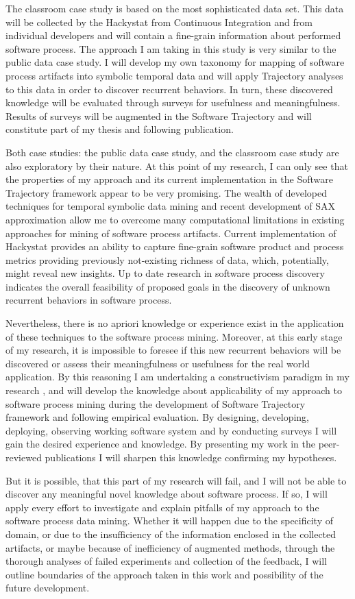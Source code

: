 The classroom case study is based on the most sophisticated data set. This data will be collected by the Hackystat from Continuous Integration and from individual developers and will contain a fine-grain information about performed software process. The approach I am taking in this study is very similar to the public data case study. I will develop my own taxonomy for mapping of software process artifacts into symbolic temporal data and will apply Trajectory analyses to this data in order to discover recurrent behaviors. In turn, these discovered knowledge will be evaluated through surveys for usefulness and meaningfulness. Results of surveys will be augmented in the Software Trajectory and will constitute part of my thesis and following publication.

Both case studies: the public data case study, and the classroom case study are also exploratory by their nature. At this point of my research, I can only see that the properties of my approach and its current implementation in the Software Trajectory framework appear to be very promising. The wealth of developed techniques for temporal symbolic data mining and recent development of SAX approximation allow me to overcome many computational limitations in existing approaches for mining of software process artifacts. Current implementation of Hackystat provides an ability to capture fine-grain software product and process metrics providing previously not-existing richness of data, which, potentially, might reveal new insights. Up to date research in software process discovery indicates the overall feasibility of proposed goals in the discovery of unknown recurrent behaviors in software process. 

Nevertheless, there is no apriori knowledge or experience exist in the application of these techniques to the software process mining. Moreover, at this early stage of my research, it is impossible to foresee if this new recurrent behaviors will be discovered or assess their meaningfulness or usefulness for the real world application. By this reasoning I am undertaking a constructivism paradigm in my research \cite{citeulike:209817}, and will develop the knowledge about  applicability of my approach to software process mining during the development of Software Trajectory framework and following empirical evaluation. By designing, developing, deploying, observing working software system and by conducting surveys I will gain the desired experience and knowledge. By presenting my work in the peer-reviewed publications I will sharpen this knowledge confirming my hypotheses.

But it is possible, that this part of my research will fail, and I will not be able to discover any meaningful novel knowledge about software process. If so, I will apply every effort to investigate and explain pitfalls of my approach to the software process data mining. Whether it will happen due to the specificity of domain, or due to the insufficiency of the information enclosed in the collected artifacts, or maybe because of inefficiency of augmented methods, through the thorough analyses of failed experiments and collection of the feedback, I will outline boundaries of the approach taken in this work and possibility of the future development.
